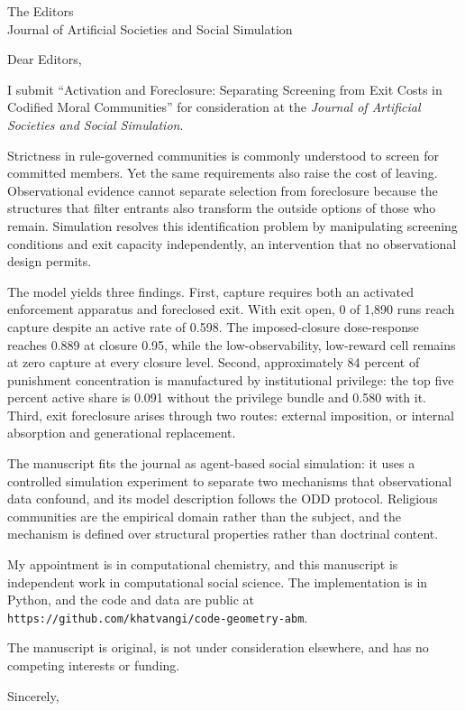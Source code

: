 \documentclass[12pt]{letter}
\date{\today}
\begin{document}
\begin{letter}{The Editors\\Journal of Artificial Societies and Social Simulation}
\opening{Dear Editors,}

I submit ``Activation and Foreclosure: Separating Screening from Exit Costs in Codified Moral Communities'' for consideration at the \textit{Journal of Artificial Societies and Social Simulation}.

Strictness in rule-governed communities is commonly understood to screen for committed members. Yet the same requirements also raise the cost of leaving. Observational evidence cannot separate selection from foreclosure because the structures that filter entrants also transform the outside options of those who remain. Simulation resolves this identification problem by manipulating screening conditions and exit capacity independently, an intervention that no observational design permits.

The model yields three findings. First, capture requires both an activated enforcement apparatus and foreclosed exit. With exit open, 0 of 1,890 runs reach capture despite an active rate of 0.598. The imposed-closure dose-response reaches 0.889 at closure 0.95, while the low-observability, low-reward cell remains at zero capture at every closure level. Second, approximately 84 percent of punishment concentration is manufactured by institutional privilege: the top five percent active share is 0.091 without the privilege bundle and 0.580 with it. Third, exit foreclosure arises through two routes: external imposition, or internal absorption and generational replacement.

The manuscript fits the journal as agent-based social simulation: it uses a controlled simulation experiment to separate two mechanisms that observational data confound, and its model description follows the ODD protocol. Religious communities are the empirical domain rather than the subject, and the mechanism is defined over structural properties rather than doctrinal content.

My appointment is in computational chemistry, and this manuscript is independent work in computational social science. The implementation is in Python, and the code and data are public at \texttt{https://github.com/khatvangi/code-geometry-abm}.

The manuscript is original, is not under consideration elsewhere, and has no competing interests or funding.

\closing{Sincerely,}
\end{letter}
\end{document}
